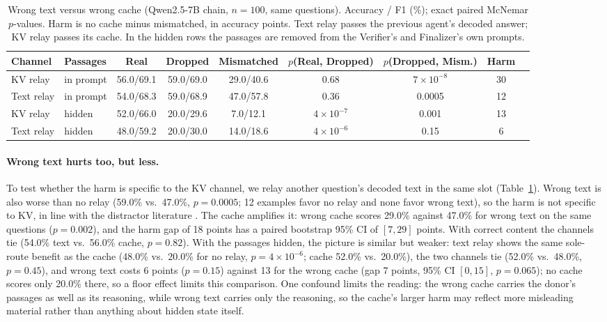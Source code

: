 \documentclass[11pt]{article}
\begin{document}
\begin{table}[t]
\centering
\small
\caption{Wrong text versus wrong cache (Qwen2.5-7B chain, $n{=}100$, same
questions). Accuracy / F1 (\%); exact paired McNemar $p$-values. Harm is no cache
minus mismatched, in accuracy points. Text relay passes the previous agent's
decoded answer; KV relay passes its cache. In the hidden rows the passages are
removed from the Verifier's and Finalizer's own prompts.}
\label{tab:textctrl}
\begin{tabular}{llccccccc}
\toprule
\textbf{Channel} & \textbf{Passages} & \textcolor{realblue}{\textbf{Real}} & \textbf{Dropped} & \textcolor{wrongred}{\textbf{Mismatched}} & $p$(Real, Dropped) & $p$(Dropped, Mism.) & \textbf{Harm} \\
\midrule
KV relay   & in prompt & 56.0/69.1 & 59.0/69.0 & 29.0/40.6 & 0.68 & $7\times10^{-8}$ & 30 \\
Text relay & in prompt & 54.0/68.3 & 59.0/68.9 & 47.0/57.8 & 0.36 & 0.0005           & 12 \\
\midrule
KV relay   & hidden    & 52.0/66.0 & 20.0/29.6 & 7.0/12.1  & $4\times10^{-7}$ & 0.001 & 13 \\
Text relay & hidden    & 48.0/59.2 & 20.0/30.0 & 14.0/18.6 & $4\times10^{-6}$ & 0.15  & 6 \\
\bottomrule
\end{tabular}
\end{table}

\paragraph{Wrong text hurts too, but less.} To test whether the harm is specific
to the KV channel, we relay another question's decoded text in the same slot
(Table~\ref{tab:textctrl}). Wrong text is also worse than no relay (59.0\%
vs.\ 47.0\%, $p=0.0005$; 12 examples favor no relay and none favor wrong text), so
the harm is not specific to KV, in line with the distractor literature
\citep{shi2023distracted}. The cache amplifies it: wrong cache scores 29.0\%
against 47.0\% for wrong text on the same questions ($p=0.002$), and the harm gap of
18 points has a paired bootstrap 95\% CI of $[7,29]$ points. With correct content the
channels tie (54.0\% text vs.\ 56.0\% cache, $p=0.82$). With the passages
hidden, the picture is similar but weaker: text relay shows the same sole-route
benefit as the cache (48.0\% vs.\ 20.0\% for no relay, $p=4\times10^{-6}$; cache
52.0\% vs.\ 20.0\%), the two channels tie (52.0\% vs.\ 48.0\%, $p=0.45$), and wrong
text costs 6 points ($p=0.15$) against 13 for the wrong cache (gap 7 points, 95\% CI
$[0,15]$, $p=0.065$); no cache scores only 20.0\% there, so a floor effect limits
this comparison. One confound limits the reading: the wrong cache carries the donor's passages as well as its reasoning,
while wrong text carries only the reasoning, so the cache's larger harm may reflect
more misleading material rather than anything about hidden state itself.
\end{document}
